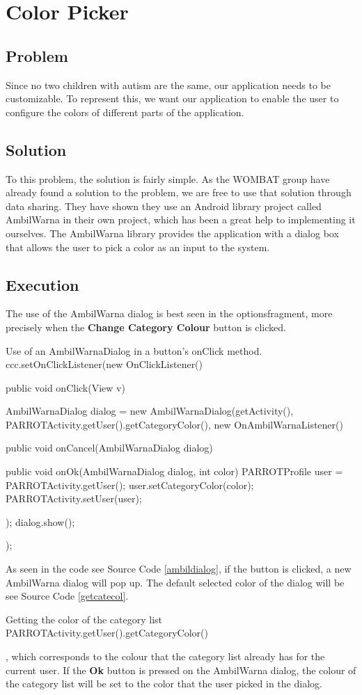 \section{Color Picker}%
\subsection*{Problem}
Since no two children with autism are the same, our application needs to be customizable. To represent this, we want our application to enable the user to configure the colors of different parts of the application.

\subsection*{Solution}
To this problem, the solution is fairly simple. As the WOMBAT group have already found a solution to the problem, we are free to use that solution through data sharing. %
They have shown they use an Android library project called AmbilWarna in their own project, which has been a great help to implementing it ourselves. The AmbilWarna library provides the application with a dialog box that allows the user to pick a color as an input to the system.

\subsection*{Execution}{}
The use of the AmbilWarna dialog is best seen in the optionsfragment, more precisely when the \textbf{Change Category Colour} button is clicked.

\begin{source}[{ambildialog}]{Use of an AmbilWarnaDialog in a button's onClick method.}
		ccc.setOnClickListener(new OnClickListener() {
			public void onClick(View v) {
				AmbilWarnaDialog dialog = new AmbilWarnaDialog(getActivity(),
						PARROTActivity.getUser().getCategoryColor(), new OnAmbilWarnaListener() {
					public void onCancel(AmbilWarnaDialog dialog) {
					}

					public void onOk(AmbilWarnaDialog dialog, int color) {
						PARROTProfile user = PARROTActivity.getUser();
						user.setCategoryColor(color);
						PARROTActivity.setUser(user);
					}
				});
				dialog.show();
			}
		});
\end{source}

As seen in the code see Source Code \ref{ambildialog}, if the button is clicked, a new AmbilWarna dialog will pop up. The default selected color of the dialog will be see Source Code \ref{getcatecol}. 
\begin{source}[{getcatecol}]{Getting the color of the category list}
PARROTActivity.getUser().getCategoryColor()
\end{source}, which corresponds to the colour that the category list already has for the current user.\newline
If the \textbf{Ok} button is pressed on the AmbilWarna dialog, the colour of the category list will be set to the color that the user picked in the dialog.

